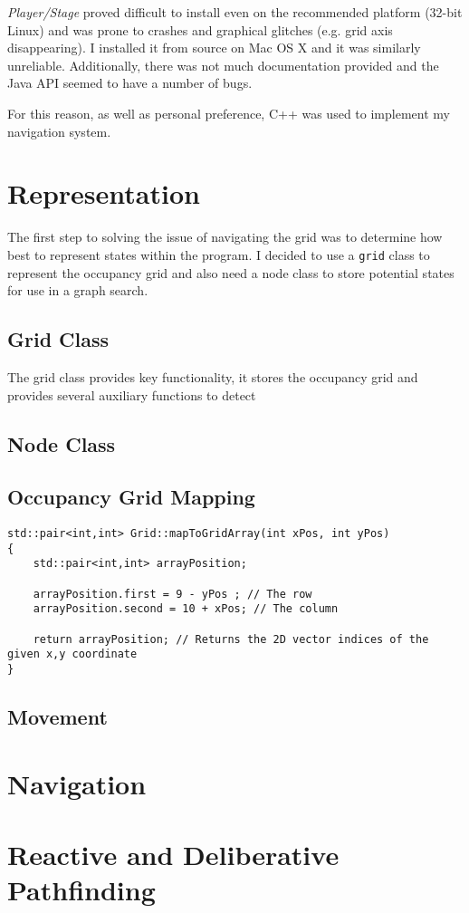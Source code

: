 \documentclass[a4paper,12pt]{article}
\begin{document}
\textit{Player/Stage} proved difficult to install even on the recommended platform (32-bit Linux) and was prone to crashes and graphical glitches (e.g. grid axis disappearing). I installed it from source on Mac OS X and it was similarly unreliable. Additionally, there was not much documentation provided and the Java API seemed to have a number of bugs. 

For this reason, as well as personal preference, C++ was used to implement my navigation system.
\section{Representation}
The first step to solving the issue of navigating the grid was to determine how best to represent states within the program. I decided to use a \texttt{grid} class to represent the occupancy grid and also need a node class to store potential states for use in a graph search. 
\subsection{Grid Class}
The grid class provides key functionality, it stores the occupancy grid and provides several auxiliary functions to detect 
\subsection{Node Class}
\subsection{Occupancy Grid Mapping}
\begin{lstlisting}
std::pair<int,int> Grid::mapToGridArray(int xPos, int yPos)
{
    std::pair<int,int> arrayPosition;

    arrayPosition.first = 9 - yPos ; // The row
    arrayPosition.second = 10 + xPos; // The column

    return arrayPosition; // Returns the 2D vector indices of the given x,y coordinate
}
\end{lstlisting}
\subsection{Movement}
\section{Navigation}
\section{Reactive and Deliberative Pathfinding}
\end{document}

